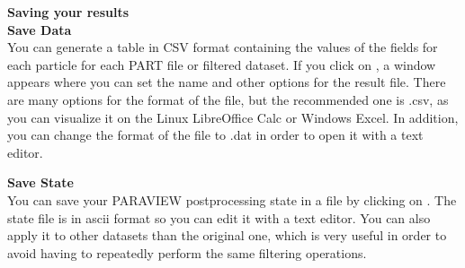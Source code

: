 \documentclass{../GPUSPHtemplate}
\begin{document}
\textbf{Saving your results} \\

\textbf{Save Data} \\
You can generate a table in CSV format containing the values of the 
fields for each particle for each PART file or filtered dataset. 
If you click on , a window appears where 
you can set the name and other options for the result file. 
There are many options for the format of the file, but the recommended 
one is .csv, as you can visualize it on the Linux LibreOffice Calc 
or Windows Excel. In addition, 
you can change the format of the file to .dat in order to open 
it with a text editor. 

\textbf{Save State} \\
You can save your PARAVIEW postprocessing state in a file by
clicking on . The state file is in ascii
format so you can edit it with a text editor.
You can also apply it to other datasets than the original one, 
which is very useful in order to avoid having to repeatedly
perform the same filtering operations.


\end{document}
